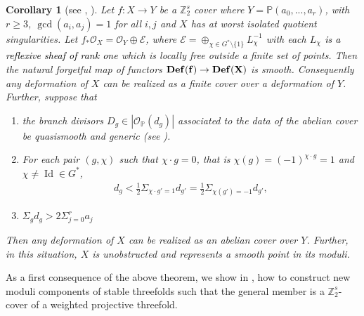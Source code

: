 \documentclass[12pt,twoside,]{amsart}
\theoremstyle{plain}
\newtheorem{corollary}[theorem]{Corollary}
\theoremstyle{definition}
\begin{document}
\begin{corollary}[see ,  ]
      Let $f: X \to Y$ be a $\mathbb{Z}_2^s$ cover where $Y = \mathbb{P}(a_0,...,a_r)$, with $r \geq 3$, $\operatorname{gcd}(a_i, a_j) = 1$ for all $i,j$ and $X$ has at worst isolated quotient singularities. Let $f_*\mathcal{O}_X = \mathcal{O}_Y \oplus \mathcal{E}$, where $\mathcal{E} = \oplus_{\chi \in G^* \setminus \{1\}}L_{\chi}^{-1}$ with each $L_{\chi}$ 
\textcolor{black}{is a reflexive sheaf of rank one} which is locally free outside a finite set of points. Then the natural forgetful map of functors $\bf Def(f) \to \bf Def(X)$ is smooth. Consequently any deformation of $X$ can be realized as a finite cover over a deformation of $Y$. Further, suppose that 
    \begin{enumerate}
        \item the branch divisors $D_g \in | \mathcal{O}_{\mathbb{P}}(d_g)|$ associated to the data of the abelian cover be quasismooth and generic (see ).
        
        \item For each pair $(g, \chi)$ such that $\chi \cdot g = 0$, 
        that is $\chi(g) =  (-1)^{\chi \cdot g} = 1$
        and $\chi \neq \operatorname{Id} \in G^*$, 
        \begin{align*}
        d_g < \displaystyle\frac{1}{2} \Sigma_{\chi \cdot g' = 1} d_{g'}
        =
        \displaystyle\frac{1}{2} 
        \Sigma_{\chi(g') = -1} d_{g'},
        \end{align*}

        \item $\Sigma_g d_g > 2 \Sigma_{j=0}^r a_j$
    \end{enumerate}

Then any deformation of $X$ can be realized as an abelian cover over $Y$. Further, in this situation, $X$ is unobstructed and represents a smooth point in its moduli.
\end{corollary}

As a first consequence of the above theorem, we show in , how to construct new moduli components of stable threefolds such that the general member is a $\mathbb{Z}_2^s$-cover of a weighted projective threefold.
\end{document}
